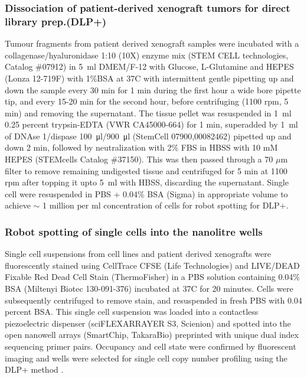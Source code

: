 \documentclass{article}
\begin{document}
\subsubsection{Dissociation of patient-derived xenograft tumors for direct library prep.(DLP+)}

Tumour fragments from patient derived xenograft samples were incubated with a collagenase/hyaluronidase 1:10 (10X) enzyme mix (STEM CELL technologies, Catalog \#07912) in  \SI{5}{\ml} DMEM/F-12 with Glucose, L-Glutamine and HEPES (Lonza 12-719F) with 1\%BSA at 37C with intermittent gentle pipetting up and down the sample every 30 min for 1 min during the first hour a wide bore pipette tip, 
and every 15-20 min for the second hour, before centrifuging (1100 rpm, 5 min) and removing the supernatant.
The tissue pellet was resuspended in \SI{1}{\ml} 0.25 percent trypsin-EDTA (VWR CA45000-664) for 1 min, 
superadded by \SI{1}{\ml} of DNAse 1/dispase \SI{100}{\ul}/\SI{900}{\ul} (StemCell 07900,00082462) pipetted up and down 2 min, followed by neutralization with 2\% FBS in HBSS with 10 mM HEPES (STEMcells Catalog \#37150). 
This was then passed through a 70 $\mu$m filter to remove remaining undigested tissue and centrifuged for 5 min at 1100 rpm after topping it upto \SI{5}{\ml} with HBSS, discarding the supernatant.
Single cell were resuspended in PBS + 0.04\% BSA (Sigma) in appropriate volume to achieve $\sim$ 1 million per ml concentration of cells for robot spotting for DLP+.

\subsubsection{Robot spotting of single cells into the nanolitre wells}
Single cell suspensions from cell lines and patient derived xenografts were fluorescently stained using CellTrace CFSE (Life Technologies) and LIVE/DEAD Fixable Red Dead Cell Stain (ThermoFisher) in a PBS solution containing 0.04\% BSA (Miltenyi Biotec 130-091-376) incubated at 37C for 20 minutes. Cells were subsequently centrifuged to remove stain, and resuspended in fresh PBS with 0.04 percent BSA. This single cell suspension was loaded into a contactless piezoelectric dispenser (sciFLEXARRAYER S3, Scienion) and spotted into the open nanowell arrays (SmartChip, TakaraBio) preprinted with unique dual index sequencing primer pairs. Occupancy and cell state were confirmed by fluorescent imaging and wells were selected for single cell copy number profiling using the DLP+ method \cite{Laks411058}.
\end{document}
